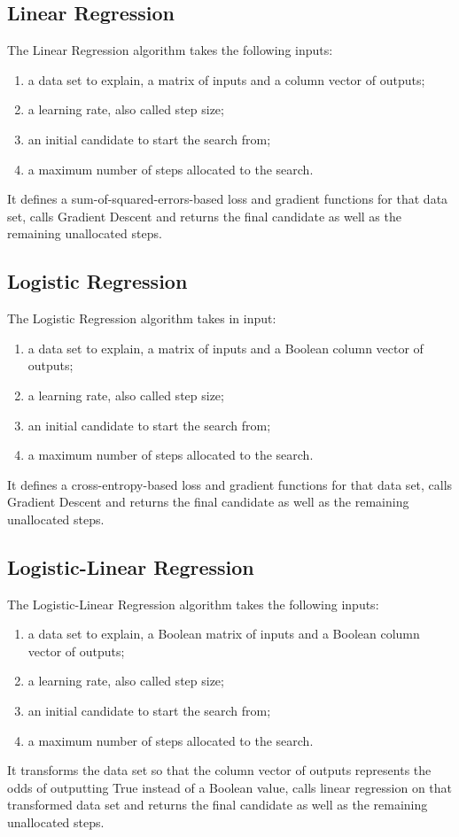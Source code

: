 \documentclass[]{report}
\begin{document}
\subsection{Linear Regression}
The Linear Regression algorithm takes the following inputs:
\begin{enumerate}
\item a data set to explain, a matrix of inputs and a column vector
  of outputs;
\item a learning rate, also called step size;
\item an initial candidate to start the search from;
\item a maximum number of steps allocated to the search.
\end{enumerate}
It defines a sum-of-squared-errors-based loss and gradient functions
for that data set, calls Gradient Descent and returns the final
candidate as well as the remaining unallocated steps.

\subsection{Logistic Regression}
The Logistic Regression algorithm takes in input:
\begin{enumerate}
\item a data set to explain, a matrix of inputs and a Boolean column
  vector of outputs;
\item a learning rate, also called step size;
\item an initial candidate to start the search from;
\item a maximum number of steps allocated to the search.
\end{enumerate}
It defines a cross-entropy-based loss and gradient functions for that
data set, calls Gradient Descent and returns the final candidate as
well as the remaining unallocated steps.

\subsection{Logistic-Linear Regression}
The Logistic-Linear Regression algorithm takes the following inputs:
\begin{enumerate}
\item a data set to explain, a Boolean matrix of inputs and a Boolean
  column vector of outputs;
\item a learning rate, also called step size;
\item an initial candidate to start the search from;
\item a maximum number of steps allocated to the search.
\end{enumerate}
It transforms the data set so that the column vector of outputs
represents the odds of outputting True instead of a Boolean value,
calls linear regression on that transformed data set and returns the
final candidate as well as the remaining unallocated steps.
\end{document}
